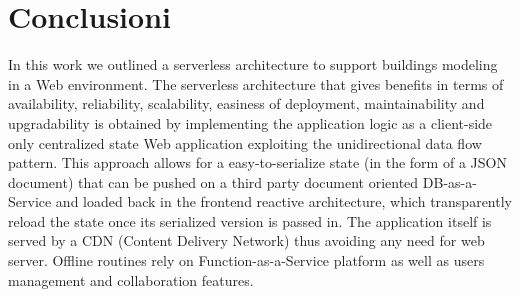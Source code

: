\section{Conclusioni}
\label{sec:conclusions_section_1}

In this work we outlined a serverless architecture to support buildings modeling in a Web environment. The serverless  architecture that gives benefits in terms of availability, reliability, scalability, easiness of deployment, maintainability and upgradability is obtained by implementing the application logic as a client-side only centralized state Web application exploiting the unidirectional data flow pattern. This approach allows for a easy-to-serialize state (in the form of a JSON document) that can be pushed on a third party document oriented DB-as-a-Service and loaded back in the frontend reactive architecture, which transparently reload the state once its serialized version is passed in. The application itself is served by a CDN (Content Delivery Network) thus avoiding any need for web server. Offline routines rely on Function-as-a-Service platform as well as users management and collaboration features.

